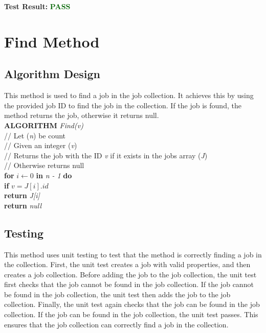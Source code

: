 \documentclass[12pt,a4paper]{article}
\begin{document}
			\textbf{Test Result:} \textbf{\textcolor{darkgreen}{PASS}}\\

	\newpage

	\section{Find Method}
		\subsection{Algorithm Design}
			This method is used to find a job in the job collection. It achieves this by using the provided 
			job ID to find the job in the collection. If the job is found, the method returns the job, 
			otherwise it returns null.\\

			\textbf{ALGORITHM} \textit{Find(v)}\\
			\null\hspace{1cm}// Let (\textit{n}) be count\\
			\null\hspace{1cm}// Given an integer (\textit{v})\\
			\null\hspace{1cm}// Returns the job with the ID \textit{v} if it exists in the jobs array (\textit{J})\\
			\null\hspace{1cm}// Otherwise returns null\\
			\null\hspace{1cm}\textbf{for} \textit{$i \gets 0$} \textbf{in} \textit{n - 1} \textbf{do}\\
			\null\hspace{2cm}\textbf{if} \textit{$v = J[i].id$}\\
			\null\hspace{3cm}\textbf{return} \textit{J[i]}\\
			\null\hspace{1cm}\textbf{return} \textit{null}\\

		\subsection{Testing}
			This method uses unit testing to test that the method is correctly finding a job in the 
			collection. First, the unit test creates a job with valid properties, and then creates 
			a job collection. Before adding the job to the job collection, the unit test 
			first checks that the job cannot be found in the job collection. If the job 
			cannot be found in the job collection, the unit test then adds the job to the 
			job collection. Finally, the unit test again checks that the job can be found in the 
			job collection. If the job can be found in the job collection, the unit test passes. 
			This ensures that the job collection can correctly find a job in the collection.\\
\end{document}
